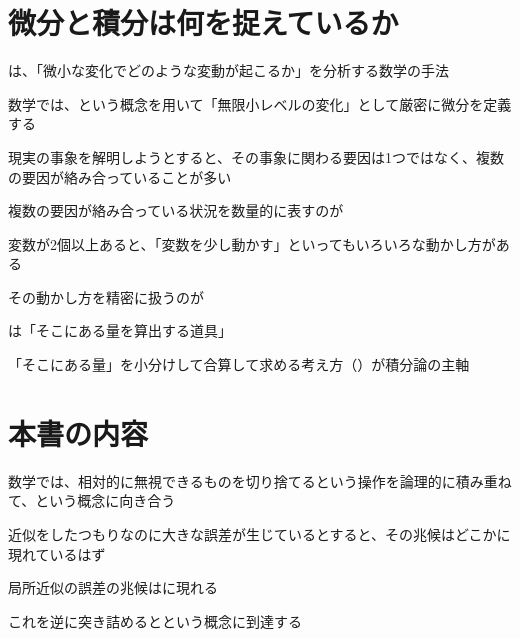 \documentclass[../book_jiriki_calc]{subfiles}
\begin{document}
\section*{微分と積分は何を捉えているか}

は、「微小な変化でどのような変動が起こるか」を分析する数学の手法

数学では、という概念を用いて「無限小レベルの変化」として厳密に微分を定義する

\sectionline

現実の事象を解明しようとすると、その事象に関わる要因は1つではなく、複数の要因が絡み合っていることが多い

複数の要因が絡み合っている状況を数量的に表すのが

\sectionline

変数が2個以上あると、「変数を少し動かす」といってもいろいろな動かし方がある

その動かし方を精密に扱うのが

\sectionline

は「そこにある量を算出する道具」

「そこにある量」を小分けして合算して求める考え方（）が積分論の主軸

\section*{本書の内容}

数学では、相対的に無視できるものを切り捨てるという操作を論理的に積み重ねて、という概念に向き合う

\sectionline

近似をしたつもりなのに大きな誤差が生じているとすると、その兆候はどこかに現れているはず

局所近似の誤差の兆候はに現れる

これを逆に突き詰めるとという概念に到達する
\end{document}
